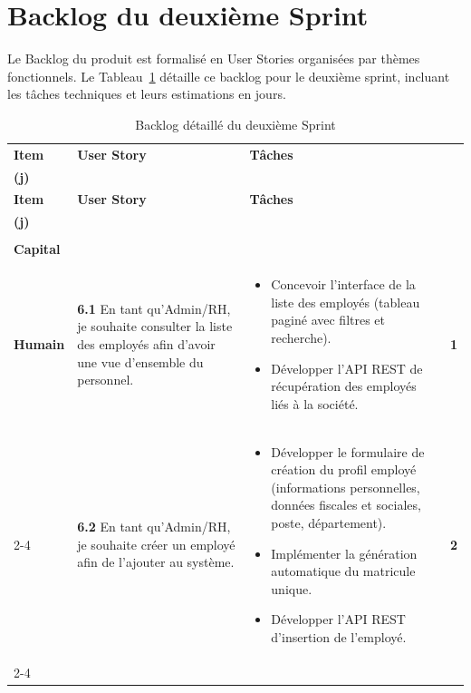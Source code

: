 \section{Backlog du deuxième Sprint}
\label{sec:s2-backlog}

Le Backlog du produit est formalisé en User Stories organisées
par thèmes fonctionnels. Le Tableau~\ref{tab:backlog-sprint2} détaille ce
backlog pour le deuxième sprint, incluant les tâches techniques et leurs
estimations en jours.

\begin{small}
\renewcommand{\arraystretch}{1.4}
\setlength{\LTleft}{\fill}
\setlength{\LTright}{\fill}
\begin{longtable}{|p{2.5cm}|p{6.0cm}|p{6.0cm}|c|}
\hline
\rowcolor[gray]{0.9} \textbf{Item} & \textbf{User Story} & \textbf{Tâches} & 
\makecell{\textbf{Est.}\\\textbf{(j)}} \\ \hline
\endfirsthead

\hline
\rowcolor[gray]{0.9} \textbf{Item} & \textbf{User Story} & \textbf{Tâches} & 
\makecell{\textbf{Est.}\\\textbf{(j)}} \\ \hline
\endhead
\hline
\endfoot
\hline
\caption{Backlog détaillé du deuxième Sprint}
\label{tab:backlog-sprint2}
\endlastfoot
\multirow{5}{*}{\makecell[c]{\textbf{Gestion du}\\ \textbf{Capital}\\ \textbf{Humain}}}
& \textbf{6.1} En tant qu'Admin/RH, je souhaite consulter la liste des
  employés afin d'avoir une vue d'ensemble du personnel.
& \begin{itemize}[leftmargin=*, noitemsep, topsep=0pt]
    \item Concevoir l'interface de la liste des employés (tableau paginé
          avec filtres et recherche).
    \item Développer l'API REST de récupération des employés liés à la
          société.
  \end{itemize}
& \textbf{1} \\ \cline{2-4}

& \textbf{6.2} En tant qu'Admin/RH, je souhaite créer un employé afin
  de l'ajouter au système.
& \begin{itemize}[leftmargin=*, noitemsep, topsep=0pt]
    \item Développer le formulaire de création du profil employé
          (informations personnelles, données fiscales et sociales,
          poste, département).
    \item Implémenter la génération automatique du matricule unique.
    \item Développer l'API REST d'insertion de l'employé.
  \end{itemize}
& \textbf{2} \\ \cline{2-4}


\end{longtable}
\end{small}
